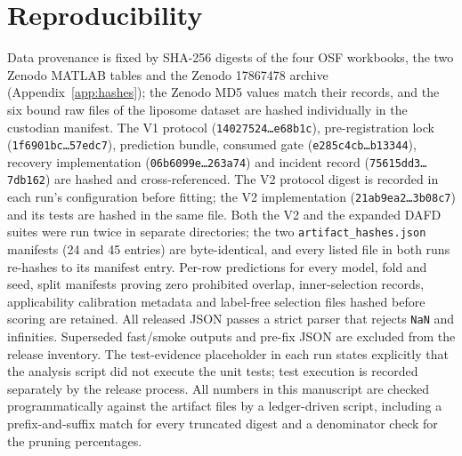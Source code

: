 \documentclass[11pt,a4paper]{article}
\newcommand{\hashtrunc}[2]{\texttt{#1\ldots#2}}
\begin{document}
\section{Reproducibility}
\label{sec:repro}
Data provenance is fixed by SHA-256 digests of the four OSF workbooks, the
two Zenodo MATLAB tables and the Zenodo 17867478 archive
(Appendix~\ref{app:hashes}); the Zenodo MD5 values match their records, and
the six bound raw files of the liposome dataset are hashed individually in
the custodian manifest. The V1 protocol (\hashtrunc{14027524}{e68b1c}),
pre-registration lock (\hashtrunc{1f6901bc}{57edc7}), prediction bundle,
consumed gate (\hashtrunc{e285c4cb}{b13344}), recovery implementation
(\hashtrunc{06b6099e}{263a74}) and incident record
(\hashtrunc{75615dd3}{7db162}) are hashed and cross-referenced. The V2
protocol digest is recorded in each run's configuration before fitting; the
V2 implementation (\hashtrunc{21ab9ea2}{3b08c7}) and its tests are hashed in
the same file. Both the V2 and the expanded DAFD suites were run twice in
separate directories; the two \texttt{artifact\_hashes.json} manifests (24 and
45 entries) are byte-identical, and every listed file in both runs
re-hashes to its manifest entry. Per-row predictions for every model, fold and
seed, split manifests proving zero prohibited overlap, inner-selection
records, applicability calibration metadata and label-free selection files
hashed before scoring are retained. All released JSON passes a strict parser
that rejects \texttt{NaN} and infinities. Superseded fast/smoke outputs and
pre-fix JSON are excluded from the release inventory. The test-evidence
placeholder in each run states explicitly that the analysis script did not
execute the unit tests; test execution is recorded separately by the release
process. All numbers in this manuscript are checked programmatically against
the artifact files by a ledger-driven script, including a prefix-and-suffix
match for every truncated digest and a denominator check for the pruning
percentages.
\end{document}

